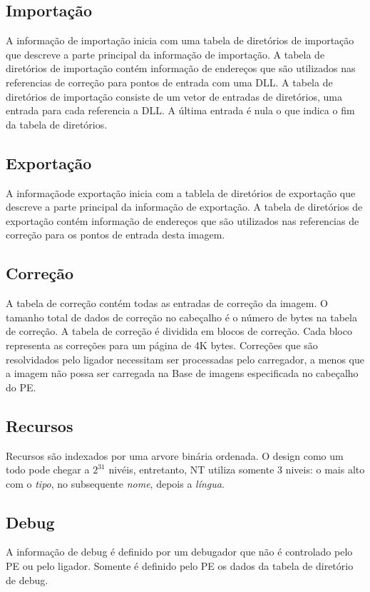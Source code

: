 \subsection{Importação}


A informação de importação inicia com uma tabela de diretórios de
importação que descreve a parte principal da informação de importação.
A tabela de diretórios de importação contém informação de endereços
que são utilizados nas referencias de correção para pontos de entrada
com uma DLL. A tabela de diretórios de importação consiste de um vetor
de entradas de diretórios, uma entrada para cada referencia a DLL.
A última entrada é nula o que indica o fim da tabela de diretórios.


\subsection{Exportação}


A informaçãode exportação inicia com a tablela de diretórios de exportação
que descreve a parte principal da informação de exportação. A tabela
de diretórios de exportação contém informação de endereços que são
utilizados nas referencias de correção para os pontos de entrada desta
imagem.


\subsection{Correção}


A tabela de correção contém todas as entradas de correção da imagem.
O tamanho total de dados de correção no cabeçalho é o número de bytes
na tabela de correção. A tabela de correção é dividida em blocos de
correção. Cada bloco representa as correções para um página de 4K
bytes. Correções que são resolvidados pelo ligador necessitam ser
processadas pelo carregador, a menos que a imagem não possa ser carregada
na Base de imagens especificada no cabeçalho do PE.


\subsection{Recursos}


Recursos são indexados por uma arvore binária ordenada. O design
como um todo pode chegar a $2^{31}$ nivéis, entretanto, NT utiliza
somente 3 niveis: o mais alto com o \emph{tipo}, no subsequente \emph{nome},
depois a \emph{língua}.


\subsection{Debug}


A informação de debug é definido por um debugador que não é controlado
pelo PE ou pelo ligador. Somente é definido pelo PE os dados da tabela
de diretório de debug.



